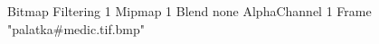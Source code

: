 {Bitmap
	{Filtering 1}
	{Mipmap 1}
	{Blend none}
	{AlphaChannel 1}
	{Frame "palatka#medic.tif.bmp"}
}
